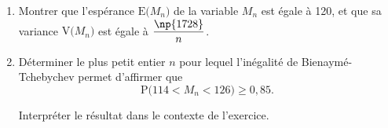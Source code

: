 \begin{enumerate}
		\begin{enumerate}
			\item Montrer que l'espérance $\mathrm{E}\big(M_{n}\big)$ de la variable $M_{n}$ est égale à 120, et que sa variance $\mathrm{V}\big(M_{n}\big)$ est égale à $\dfrac{\np{1728}}{n}$.

			\item Déterminer le plus petit entier $n$ pour lequel l'inégalité de Bienaymé-Tchebychev permet d'affirmer que \[\mathrm{P}\big(114<M_{n}<126\big) \geqslant 0,85.\]

			Interpréter le résultat dans le contexte de l'exercice.
		\end{enumerate}
	\end{enumerate}
